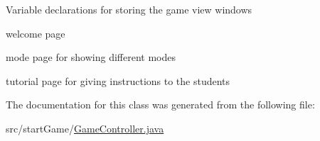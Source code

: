 Variable declarations for storing the game view windows
\begin{DoxyItemize}
\item welcome page
\item mode page for showing different modes
\item tutorial page for giving instructions to the students 
\end{DoxyItemize}

The documentation for this class was generated from the following file\+:\begin{DoxyCompactItemize}
\item 
src/start\+Game/\hyperlink{_game_controller_8java}{Game\+Controller.\+java}\end{DoxyCompactItemize}
